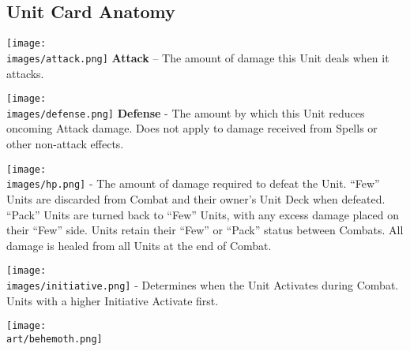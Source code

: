 \begin{multicols}{2}
\subsection*{Unit Card Anatomy}

\vspace{0pt}

\texttt{[image: \\images/attack.png]} \textbf{Attack} – The amount of damage this Unit deals when it attacks.\par
\texttt{[image: \\images/defense.png]} \textbf{Defense} - The amount by which this Unit reduces oncoming Attack damage.
Does not apply to damage received from Spells or other non-attack effects.\par
\texttt{[image: \\images/hp.png]} \textbf{} - The amount of damage required to defeat the Unit.
``Few'' Units are discarded from Combat and their owner's Unit Deck when defeated.
``Pack'' Units are turned back to ``Few'' Units, with any excess damage placed on their ``Few'' side.
Units retain their ``Few'' or ``Pack'' status between Combats.
All damage is healed from all Units at the end of Combat.\par
\texttt{[image: \\images/initiative.png]}{} - Determines when the Unit Activates during Combat.
Units with a higher Initiative Activate first.

\vfill
\hspace{-2em}
{\texttt{[image: \\art/behemoth.png]}}


\end{multicols}
